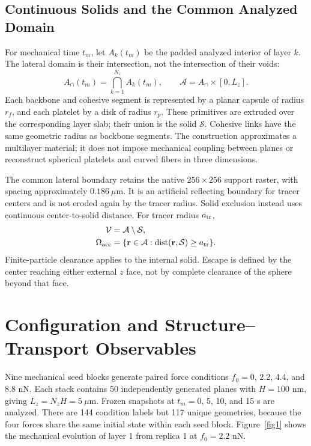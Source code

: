 \subsection{Continuous Solids and the Common Analyzed Domain}
For mechanical time $t_m$, let $A_k(t_m)$ be the padded analyzed interior of layer $k$. The lateral domain is their intersection, not the intersection of their voids:
\begin{equation}
A_\cap(t_m)=\bigcap_{k=1}^{N_z}A_k(t_m),\qquad
\mathcal A=A_\cap\times[0,L_z].
\label{eq:common-domain}
\end{equation}
Each backbone and cohesive segment is represented by a planar capsule of radius $r_f$, and each platelet by a disk of radius $r_p$. These primitives are extruded over the corresponding layer slab; their union is the solid $\mathcal S$. Cohesive links have the same geometric radius as backbone segments. The construction approximates a multilayer material; it does not impose mechanical coupling between planes or reconstruct spherical platelets and curved fibers in three dimensions.

The common lateral boundary retains the native $256\times256$ support raster, with spacing approximately $0.186~\mu\mathrm m$. It is an artificial reflecting boundary for tracer centers and is not eroded again by the tracer radius. Solid exclusion instead uses continuous center-to-solid distance. For tracer radius $a_{\rm tr}$,
\begin{equation}
\begin{aligned}
\mathcal V&=\mathcal A\setminus\mathcal S,\\
\Omega_{\rm acc}&=\{\mathbf r\in\mathcal A:
\operatorname{dist}(\mathbf r,\mathcal S)\ge a_{\rm tr}\}.
\end{aligned}
\label{eq:accessible-centers}
\end{equation}
Finite-particle clearance applies to the internal solid. Escape is defined by the center reaching either external $z$ face, not by complete clearance of the sphere beyond that face.

\section{Configuration and Structure--Transport Observables}
Nine mechanical seed blocks generate paired force conditions $f_0=0$, 2.2, 4.4, and 8.8 nN. Each stack contains 50 independently generated planes with $H=100$ nm, giving $L_z=N_zH=5~\mu\mathrm m$. Frozen snapshots at $t_m=0$, 5, 10, and 15 s are analyzed. There are 144 condition labels but 117 unique geometries, because the four forces share the same initial state within each seed block. Figure~\ref{fig1} shows the mechanical evolution of layer 1 from replica 1 at $f_0=2.2$ nN.

